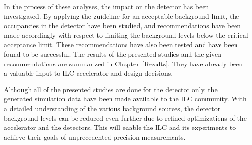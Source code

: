 In the process of these analyses, the impact on the \sid detector has been investigated.
By applying the \sid guideline for an acceptable background limit, the occupancies in the detector have been studied, and recommendations have been made accordingly with respect to limiting the background levels below the critical acceptance limit.
These recommendations have also been tested and have been found to be successful.
The results of the presented studies and the given recommendations are summarized in Chapter~\ref{Results}.
They have already been a valuable input to ILC accelerator and \sid design decisions.

Although all of the presented studies are done for the \sid detector only, the generated simulation data have been made available to the ILC community.
With a detailed understanding of the various background sources, the detector background levels can be reduced even further due to refined optimizations of the accelerator and the detectors.
This will enable the ILC and its experiments to achieve their goals of unprecedented precision measurements.